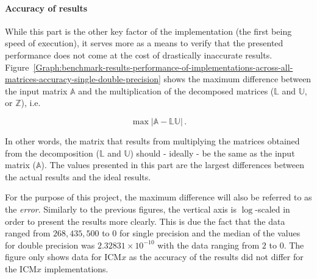 \paragraph{Accuracy of results} While this part is the other key factor of the implementation (the first being speed of execution), it serves more as a means to verify that the presented performance does not come at the cost of drastically inaccurate results. Figure~\ref{Graph:benchmark-results-performance-of-implementations-across-all-matrices-accuracy-single-double-precision} shows the maximum difference between the input matrix $ \mathbb{A} $ and the multiplication of the decomposed matrices ($ \mathbb{L} $ and $ \mathbb{U} $, or $ \mathbb{Z} $), i.e.

\begin{equation}
	\max\left| \mathbb{A} - \mathbb{L}\mathbb{U}\right| \nonumber \,.
\end{equation}

In other words, the matrix that results from multiplying the matrices obtained from the decomposition ($ \mathbb{L} $ and $ \mathbb{U} $) should - ideally - be the same as the input matrix ($ \mathbb{A} $). The values presented in this part are the largest differences between the actual results and the ideal results.
\par For the purpose of this project, the maximum difference will also be referred to as the \textit{error}. Similarly to the previous figures, the vertical axis is $ \log $-scaled in order to present the results more clearly. This is due the fact that the data ranged from $ 268,435,500 $ to $ 0 $ for single precision and the median of the values for double precision was $ 2.32831\times10^{-10} $ with the data ranging from $ 2 $ to $ 0 $. The figure only shows data for ICM$ x $ as the accuracy of the results did not differ for the ICM$ x $ implementations.

